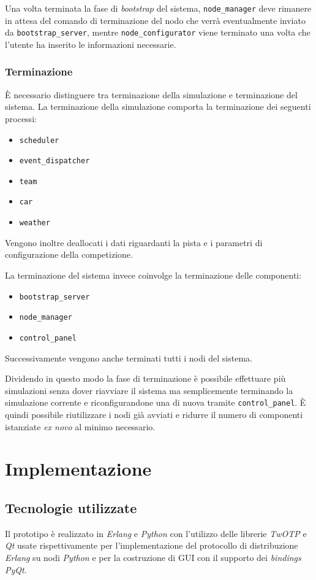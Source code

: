 \documentclass[a4paper]{report}
\newcommand{\Erlang}{\textsl{Erlang}}
\newcommand{\Python}{\textsl{Python}}
\begin{document}
Una volta terminata la fase di \textit{bootstrap} del sistema, \texttt{node\_manager} deve rimanere in attesa del comando di terminazione del nodo che verrà eventualmente inviato da \texttt{bootstrap\_server}, mentre \texttt{node\_configurator} viene terminato una volta che l'utente ha inserito le informazioni necessarie.

\subsection*{Terminazione}
\`E necessario distinguere tra terminazione della simulazione e terminazione del sistema.
La terminazione della simulazione comporta la terminazione dei seguenti processi:
\begin{itemize}
\item \texttt{scheduler}
\item \texttt{event\_dispatcher}
\item \texttt{team}
\item \texttt{car}
\item \texttt{weather}
\end{itemize}
Vengono inoltre deallocati i dati riguardanti la pista e i parametri di configurazione della competizione.

La terminazione del sistema invece coinvolge la terminazione delle componenti:
\begin{itemize}
\item \texttt{bootstrap\_server}
\item \texttt{node\_manager}
\item \texttt{control\_panel}
\end{itemize}
Successivamente vengono anche terminati tutti i nodi del sistema.

Dividendo in questo modo la fase di terminazione è possibile effettuare più simulazioni senza dover riavviare il sistema ma semplicemente terminando la simulazione corrente e riconfigurandone una di nuova tramite \texttt{control\_panel}. \`E quindi possibile riutilizzare i nodi già avviati e ridurre il numero di componenti istanziate \textit{ex novo} al minimo necessario.


\chapter{Implementazione}
\section{Tecnologie utilizzate}
Il prototipo è realizzato in \Erlang{} e \Python{} con l'utilizzo delle librerie \textsl{TwOTP} e \textsl{Qt} usate rispettivamente per l'implementazione del protocollo di distribuzione \Erlang{} su nodi \Python{} e per la costruzione di GUI con il supporto dei \textit{bindings} \textsl{PyQt}.
\end{document}
